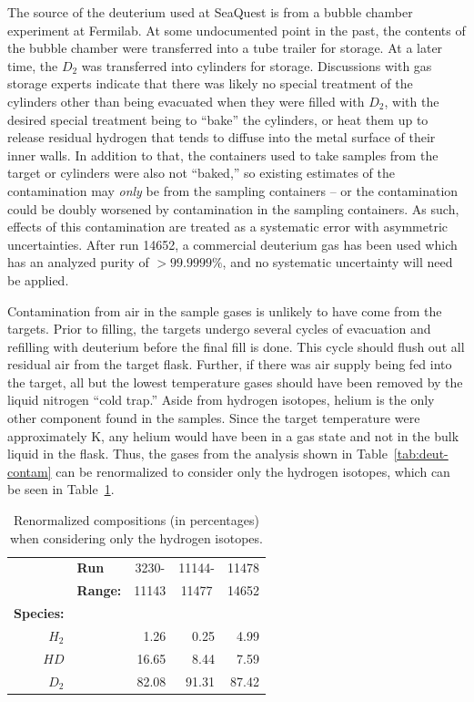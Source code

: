 The source of the deuterium used at SeaQuest is from a bubble chamber experiment at Fermilab. At some undocumented point in the past, the contents of the bubble chamber were transferred into a tube trailer for storage. At a later time, the $D_2$ was transferred into cylinders for storage. Discussions with gas storage experts indicate that there was likely no special treatment of the cylinders other than being evacuated when they were filled with $D_2$, with the desired special treatment being to ``bake'' the cylinders, or heat them up to release residual hydrogen that tends to diffuse into the metal surface of their inner walls. In addition to that, the containers used to take samples from the target or cylinders were also not ``baked,'' so existing estimates of the contamination may \emph{only} be from the sampling containers -- or the contamination could be doubly worsened by contamination in the sampling containers. As such, effects of this contamination are treated as a systematic error with asymmetric uncertainties. After run 14652, a commercial deuterium gas has been used which has an analyzed purity of $>99.9999\%$, and no systematic uncertainty will need be applied.

Contamination from air in the sample gases is unlikely to have come from the targets. Prior to filling, the targets undergo several cycles of evacuation and refilling with deuterium before the final fill is done. This cycle should flush out all residual air from the target flask. Further, if there was air supply being fed into the target, all but the lowest temperature gases should have been removed by the liquid nitrogen ``cold trap.'' Aside from hydrogen isotopes, helium is the only other component found in the samples. Since the target temperature were approximately \unit[23]{K}, any helium would have been in a gas state and not in the bulk liquid in the flask. Thus, the gases from the analysis shown in Table~\ref{tab:deut-contam} can be renormalized to consider only the hydrogen isotopes, which can be seen in Table~\ref{tab:deut-contam-renorm}.

\begin{table}
	\centering
	\begin{tabular}{@{}rlrrr@{}}
		\toprule
		{} & \textbf{Run} & \multicolumn{1}{c}{3230-} & \multicolumn{1}{c}{11144-} &  \multicolumn{1}{c}{11478} \\ 
		{} & \textbf{Range:} & \multicolumn{1}{c}{11143} & \multicolumn{1}{c}{11477} &  \multicolumn{1}{c}{14652} \\ 
		\textbf{Species:} & & & & \\ \midrule
		$H_2$	& & 1.26   & 0.25  & 4.99 \\
		$HD$    & & 16.65 & 8.44  &	 7.59 \\
		$D_2$ 	& & 82.08 & 91.31 &  87.42 \\
		\bottomrule
	\end{tabular}
	\caption{Renormalized compositions (in percentages) when considering only the hydrogen isotopes.}
	\label{tab:deut-contam-renorm}
\end{table}

